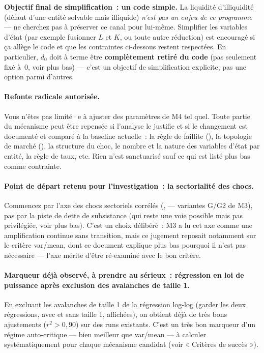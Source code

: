 \textbf{Objectif final de simplification~: un code simple.} La liquidité
d'illiquidité (défaut d'une entité solvable mais illiquide) \emph{n'est pas
un enjeu de ce programme} — ne cherchez pas à préserver ce canal pour
lui-même. Simplifier les variables d'état (par exemple fusionner $L$ et $K$,
ou toute autre réduction) est encouragé si ça allège le code et que les
contraintes ci-dessous restent respectées. En particulier, $d_0$ doit à
terme être \textbf{complètement retiré du code} (pas seulement fixé à~0,
voir plus bas) — c'est un objectif de simplification explicite, pas une
option parmi d'autres.

\paragraph{Refonte radicale autorisée.} Vous n'êtes pas limité·e à ajuster
des paramètres de M4 tel quel. Toute partie du mécanisme peut être repensée
si l'analyse le justifie et si le changement est documenté et comparé à la
baseline actuelle~: la règle de faillite (), la
topologie de marché (), la structure du choc, le nombre et
la nature des variables d'état par entité, la règle de taux, etc. Rien
n'est sanctuarisé sauf ce qui est listé plus bas comme contrainte.

\paragraph{Point de départ retenu pour l'investigation~: la sectorialité
des chocs.} Commencez par l'axe des chocs sectoriels corrélés
(,  — variantes G/G2 de M3), pas
par la piste de dette de subsistance (qui reste une voie possible mais pas
privilégiée, voir plus bas). C'est un choix délibéré~: M3 a lu cet axe comme
une amplification continue sans transition, mais ce jugement reposait
notamment sur le critère var/mean, dont ce document explique plus bas
pourquoi il n'est pas nécessaire — l'axe mérite d'être ré-examiné avec le
bon critère.

\paragraph{Marqueur déjà observé, à prendre au sérieux~: régression en loi
de puissance après exclusion des avalanches de taille 1.} En excluant les
avalanches de taille 1 de la régression log-log (garder les deux
régressions, avec et sans taille 1, affichées), on obtient déjà de très bons
ajustements ($r^2 > 0{,}90$) sur des runs existants. C'est un très bon
marqueur d'un régime auto-critique — bien meilleur que var/mean — à
calculer systématiquement pour chaque mécanisme candidat (voir « Critères de
succès »).

